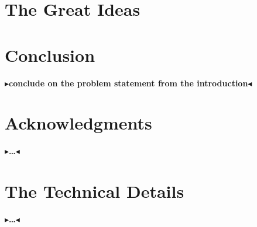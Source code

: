 \documentclass[twoside,11pt,openright]{report}
\newcommand{\todo}[1]{{\color[rgb]{.5,0,0}\textbf{$\blacktriangleright$#1$\blacktriangleleft$}}}
\begin{document}
\chapter{The Great Ideas}
\label{ch:main}

\lipsum[1-20] %


\chapter{Conclusion}
\label{ch:conclusion}

\todo{conclude on the problem statement from the introduction}

\chapter*{Acknowledgments}

\todo{\dots}


\cleardoublepage
{}
 



\cleardoublepage
\appendix
\chapter{The Technical Details}

\todo{\dots}
\end{document}
